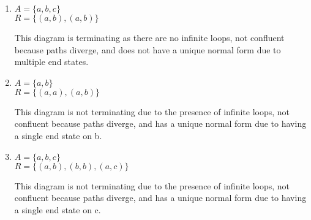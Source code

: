 \documentclass{article}
\begin{document}
\begin{enumerate}
    \item $A = \{ a, b, c \}$ \\
    \hspace*{1em} $R = \{ (a,b), (a,b) \}$

    \begin{center}
    \end{center}
    This diagram is terminating as there are no infinite loops, not confluent because paths diverge, and does not have a unique normal form due to multiple end states.

    \item $A = \{ a, b \}$ \\
    \hspace*{1em} $R = \{ (a,a), (a,b) \}$

    \begin{center}
    \end{center}
    This diagram is not terminating due to the presence of infinite loops, not confluent because paths diverge, and has a unique normal form due to having a single end state on b.

    \item $A = \{ a, b, c \}$ \\
    \hspace*{1em} $R = \{ (a,b), (b,b), (a,c) \}$
    \begin{center}
    \end{center}
    This diagram is not terminating due to the presence of infinite loops, not confluent because paths diverge, and has a unique normal form due to having a single end state on c.


\end{enumerate}
\end{document}

